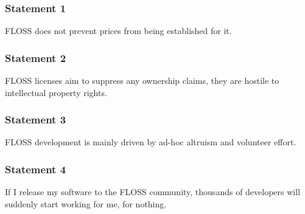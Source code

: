 \documentclass{beamer}
\begin{document}

\begin{frame}
 \frametitle{Statement 1}
 \begin{center}
  \begin{LARGE} FLOSS does not prevent prices from being established for it.  \end{LARGE}
 \end{center}

\end{frame}


\begin{frame}
 \frametitle{Statement 2}
 \begin{center}
  \begin{LARGE} FLOSS licenses aim to suppress any ownership claims, they are hostile to
intellectual property rights.  \end{LARGE}
 \end{center}

\end{frame}


\begin{frame}
 \frametitle{Statement 3}
 \begin{center}
  \begin{LARGE} FLOSS development is mainly driven by ad-hoc altruism and volunteer effort. \end{LARGE}
 \end{center}

\end{frame}


\begin{frame}
 \frametitle{Statement 4}
 \begin{center}
  \begin{LARGE} If I release my software to the FLOSS community, thousands of developers 
will suddenly start working for me, for nothing. \end{LARGE}
 \end{center}

\end{frame}

\end{document}
